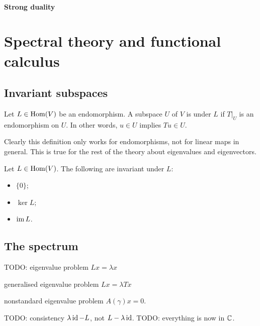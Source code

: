 \subsubsection{Strong duality}
\begin{theorem}

\end{theorem}

\chapter{Spectral theory and functional calculus}
\section{Invariant subspaces}
\begin{definition}
Let $L\in \operatorname{Hom}(V)$ be an endomorphism. A subspace $U$ of $V$ is  under $L$ if $T|_U$ is an endomorphism on $U$. In other words, $u\in U$ implies $Tu\in U$.
\end{definition}
Clearly this definition only works for endomorphisms, not for linear maps in general. This is true for the rest of the theory about eigenvalues and eigenvectors.
\begin{example}
Let $L\in \operatorname{Hom}(V)$. The following are invariant under $L$:
\begin{itemize}
\item $\{0\}$;
\item $\ker L$;
\item $\operatorname{im} L$.
\end{itemize}
\end{example}

\section{The spectrum}
TODO: eigenvalue problem $Lx = \lambda x$

generalised eigenvalue problem $Lx = \lambda T x$

nonstandard eigenvalue problem $A(\gamma)x = 0$.

TODO: consistency $\lambda \operatorname{id} - L$, not $L-\lambda \operatorname{id}$.
TODO: everything is now in $\mathbb{C}$.

